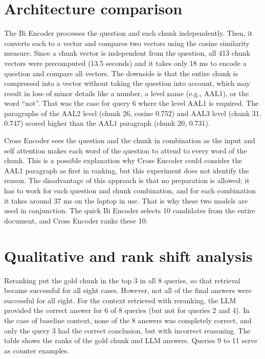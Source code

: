 \documentclass[11pt,a4paper]{article}
\begin{document}
\section{Architecture comparison}

The Bi Encoder processes the question and each chunk independently. Then, it converts each to a vector and compares two vectors using the cosine similarity measure. Since a chunk vector is independent from the question, all 413 chunk vectors were precomputed (13.5 seconds) and it takes only 18 ms to encode a question and compare all vectors. The downside is that the entire chunk is compressed into a vector without taking the question into account, which may result in loss of minor details like a number, a level name (e.g., AAL1), or the word ``not''. That was the case for query 6 where the level AAL1 is required. The paragraphs of the AAL2 level (chunk 26, cosine 0.752) and AAL3 level (chunk 31, 0.747) scored higher than the AAL1 paragraph (chunk 20, 0.731).

Cross Encoder sees the question and the chunk in combination as the input and self attention makes each word of the question to attend to every word of the chunk. This is a possible explanation why Cross Encoder could consider the AAL1 paragraph as first in ranking, but this experiment does not identify the reason. The disadvantage of this approach is that no preparation is allowed; it has to work for each question and chunk combination, and for each combination it takes around 37 ms on the laptop in use. That is why these two models are used in conjunction. The quick Bi Encoder selects 10 candidates from the entire document, and Cross Encoder ranks these 10.

\section{Qualitative and rank shift analysis}

Reranking put the gold chunk in the top 3 in all 8 queries, so that retrieval became successful for all eight cases. However, not all of the final answers were successful for all eight. For the context retrieved with reranking, the LLM provided the correct answer for 6 of 8 queries (but not for queries 2 and 4). In the case of baseline context, none of the 8 answers was completely correct, and only the query 3 had the correct conclusion, but with incorrect reasoning. The table shows the ranks of the gold chunk and LLM answers. Queries 9 to 11 serve as counter examples.
\end{document}
